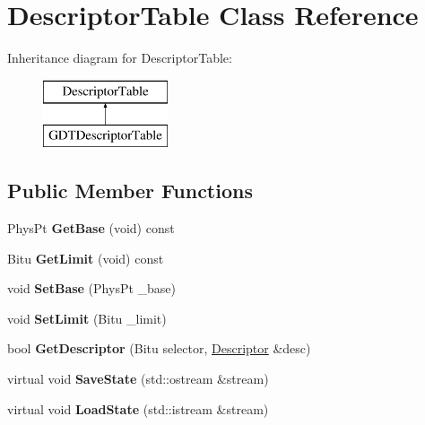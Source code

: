 \hypertarget{classDescriptorTable}{\section{Descriptor\-Table Class Reference}
\label{classDescriptorTable}
}
Inheritance diagram for Descriptor\-Table\-:\begin{figure}[H]
\begin{center}
\leavevmode
\includegraphics[height=2.000000cm]{classDescriptorTable}
\end{center}
\end{figure}
\subsection*{Public Member Functions}
\begin{DoxyCompactItemize}
\item 
\hypertarget{classDescriptorTable_ae907889e12488e2a5d3e05cb773f521f}{Phys\-Pt {\bfseries Get\-Base} (void) const }\label{classDescriptorTable_ae907889e12488e2a5d3e05cb773f521f}

\item 
\hypertarget{classDescriptorTable_ac6d5e2e303f54d35204cd719a6293e3b}{Bitu {\bfseries Get\-Limit} (void) const }\label{classDescriptorTable_ac6d5e2e303f54d35204cd719a6293e3b}

\item 
\hypertarget{classDescriptorTable_a615d69b99e491d50023e9feca950583f}{void {\bfseries Set\-Base} (Phys\-Pt \-\_\-base)}\label{classDescriptorTable_a615d69b99e491d50023e9feca950583f}

\item 
\hypertarget{classDescriptorTable_a537ad64528d292f9c7c791d8a754da35}{void {\bfseries Set\-Limit} (Bitu \-\_\-limit)}\label{classDescriptorTable_a537ad64528d292f9c7c791d8a754da35}

\item 
\hypertarget{classDescriptorTable_a5b7215649b48adf865cb4ca21c5e2a1d}{bool {\bfseries Get\-Descriptor} (Bitu selector, \hyperlink{classDescriptor}{Descriptor} \&desc)}\label{classDescriptorTable_a5b7215649b48adf865cb4ca21c5e2a1d}

\item 
\hypertarget{classDescriptorTable_a80d87945ca28c37777962b09403c8a4c}{virtual void {\bfseries Save\-State} (std\-::ostream \&stream)}\label{classDescriptorTable_a80d87945ca28c37777962b09403c8a4c}

\item 
\hypertarget{classDescriptorTable_a811ceb84d4c1730ecd49bbaa329e7292}{virtual void {\bfseries Load\-State} (std\-::istream \&stream)}\label{classDescriptorTable_a811ceb84d4c1730ecd49bbaa329e7292}

\end{DoxyCompactItemize}
